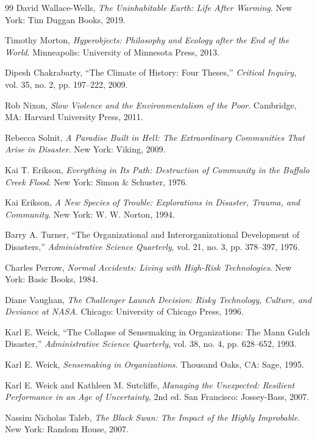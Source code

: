 \documentclass[11pt,oneside]{book}
\theoremstyle{definition}
\theoremstyle{remark}
\begin{document}
\begin{thebibliography}{99}
 David Wallace-Wells, \emph{The Uninhabitable Earth: Life After Warming}. New York: Tim Duggan
  Books, 2019.

 Timothy Morton, \emph{Hyperobjects: Philosophy and Ecology after the End of the World}.
  Minneapolis: University of Minnesota Press, 2013.

 Dipesh Chakrabarty, ``The Climate of History: Four Theses,'' \emph{Critical Inquiry}, vol. 35,
  no. 2, pp. 197--222, 2009.

 Rob Nixon, \emph{Slow Violence and the Environmentalism of the Poor}. Cambridge, MA: Harvard
  University Press, 2011.

 Rebecca Solnit, \emph{A Paradise Built in Hell: The Extraordinary Communities That Arise in
  Disaster}. New York: Viking, 2009.

 Kai T. Erikson, \emph{Everything in Its Path: Destruction of Community in the Buffalo Creek
  Flood}. New York: Simon \& Schuster, 1976.

 Kai Erikson, \emph{A New Species of Trouble: Explorations in Disaster, Trauma, and Community}.
  New York: W. W. Norton, 1994.

 Barry A. Turner, ``The Organizational and Interorganizational Development of Disasters,''
  \emph{Administrative Science Quarterly}, vol. 21, no. 3, pp. 378--397, 1976.

 Charles Perrow, \emph{Normal Accidents: Living with High-Risk Technologies}. New York: Basic
  Books, 1984.

 Diane Vaughan, \emph{The Challenger Launch Decision: Risky Technology, Culture, and Deviance at
  NASA}. Chicago: University of Chicago Press, 1996.

 Karl E. Weick, ``The Collapse of Sensemaking in Organizations: The Mann Gulch Disaster,''
  \emph{Administrative Science Quarterly}, vol. 38, no. 4, pp. 628--652, 1993.

 Karl E. Weick, \emph{Sensemaking in Organizations}. Thousand Oaks, CA: Sage, 1995.

 Karl E. Weick and Kathleen M. Sutcliffe, \emph{Managing the Unexpected: Resilient Performance in
  an Age of Uncertainty}, 2nd ed. San Francisco: Jossey-Bass, 2007.

 Nassim Nicholas Taleb, \emph{The Black Swan: The Impact of the Highly Improbable}. New York:
  Random House, 2007.


\end{thebibliography}
\end{document}
